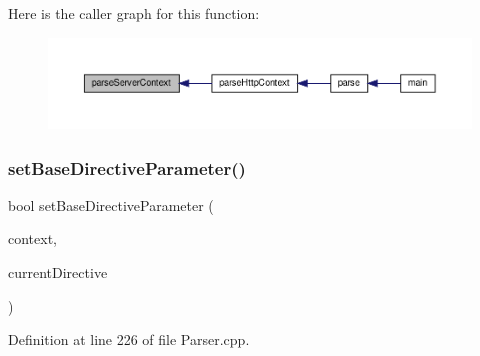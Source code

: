 Here is the caller graph for this function\+:
\nopagebreak
\begin{figure}[H]
\begin{center}
\leavevmode
\includegraphics[width=350pt]{classft_1_1_parser_ae53bb700e0344f7af2519a5af3ae4230_icgraph}
\end{center}
\end{figure}
\mbox{\label{classft_1_1_parser_a9f412d172694519d0d8dd9edacd257c0}} 
\subsubsection{\texorpdfstring{set\+Base\+Directive\+Parameter()}{setBaseDirectiveParameter()}}
{\footnotesize\ttfamily bool set\+Base\+Directive\+Parameter (\begin{DoxyParamCaption}\item[{\hyperlink{classft_1_1_base_directives}{Base\+Directives} \&}]{context,  }\item[{std\+::vector$<$ \hyperlink{classft_1_1_directive}{Directive} $>$\+::iterator \&}]{current\+Directive }\end{DoxyParamCaption})}



Definition at line 226 of file Parser.\+cpp.


